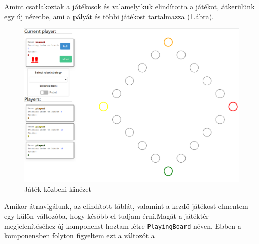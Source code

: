 \documentclass[a4paper,twoside]{article}
\begin{document}
Amint csatlakoztak a játékosok és valamelyikük elindította a játékot, átkerülünk egy új nézetbe, ami a pályát és többi játékost tartalmazza (\ref{playingboard}.ábra).
\begin{figure}
	\caption{Játék közbeni kinézet}
	\label{playingboard}
	\centering
	\includegraphics[scale=0.35]{playingboard}
\end{figure}
\FloatBarrier
Amikor átnavigálunk, az elindított táblát, valamint a kezdő játékost elmentem egy külön változóba, hogy később el tudjam érni.Magát a játéktér megjelenítéséhez új komponenst hoztam létre \verb|PlayingBoard| néven. Ebben  a komponensben folyton figyeltem ezt a változót a
\end{document}
